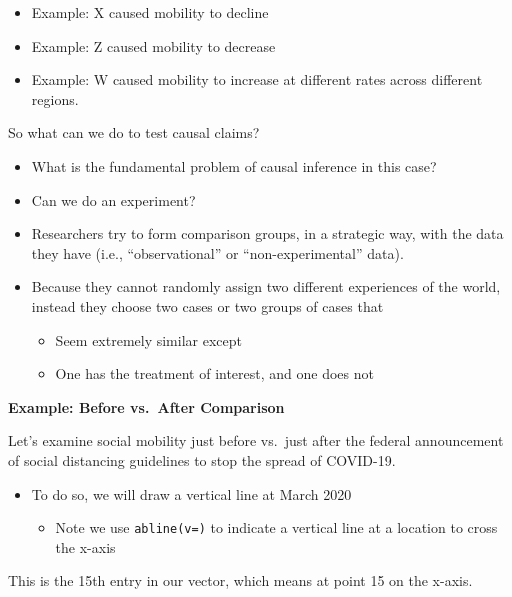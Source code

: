\documentclass[
  letterpaper,
  DIV=11,
  numbers=noendperiod]{scrreprt}
\providecommand{\tightlist}{%
  \setlength{\itemsep}{0pt}\setlength{\parskip}{0pt}}\usepackage{longtable,booktabs,array}
\begin{document}
\begin{itemize}
\tightlist
\item
  Example: X caused mobility to decline
\item
  Example: Z caused mobility to decrease
\item
  Example: W caused mobility to increase at different rates across
  different regions.
\end{itemize}

So what can we do to test causal claims?

\begin{itemize}
\tightlist
\item
  What is the fundamental problem of causal inference in this case?
\item
  Can we do an experiment?
\item
  Researchers try to form comparison groups, in a strategic way, with
  the data they have (i.e., ``observational'' or ``non-experimental''
  data).
\item
  Because they cannot randomly assign two different experiences of the
  world, instead they choose two cases or two groups of cases that

  \begin{itemize}
  \tightlist
  \item
    Seem extremely similar except
  \item
    One has the treatment of interest, and one does not
  \end{itemize}
\end{itemize}

\textbf{Example: Before vs.~After Comparison}

Let's examine social mobility just before vs.~just after the federal
announcement of social distancing guidelines to stop the spread of
COVID-19.

\begin{itemize}
\tightlist
\item
  To do so, we will draw a vertical line at March 2020

  \begin{itemize}
  \tightlist
  \item
    Note we use \texttt{abline(v=)} to indicate a vertical line at a
    location to cross the x-axis
  \end{itemize}
\end{itemize}

This is the 15th entry in our vector, which means at point 15 on the
x-axis.
\end{document}
